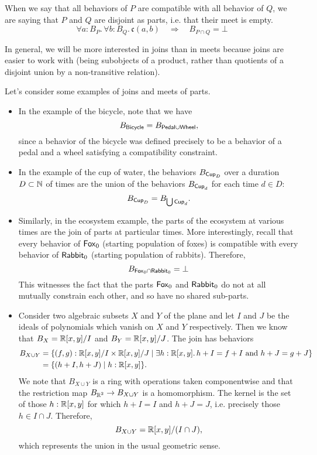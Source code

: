 When we say that all behaviors of $P$ are compatible with all behavior of $Q$, we are saying that $P$ and $Q$ are disjoint as parts, i.e. that their meet is empty.
$$\forall a : B_P.\, \forall b : B_Q.\, \mathfrak{c}(a, b) \quad\Rightarrow\quad B_{P \cap Q} = \bot$$

In general, we will be more interested in joins than in meets because joins are easier to work with (being subobjects of a product, rather than quotients of a disjoint union by a non-transitive relation).

\begin{ex}
Let's consider some examples of joins and meets of parts.
\begin{itemize}
    \item In the example of the bicycle, note that we have
    $$B_{\mathsf{{Bicycle}}} = B_{\mathsf{{Pedal}} \cup \mathsf{{Wheel}}},$$
    since a behavior of the bicycle was defined precisely to be a behavior of a pedal and a wheel satisfying a compatibility constraint.
    
    \item In the example of the cup of water, the behaviors $B_{\mathsf{{Cup}}_D}$ over a duration $D \subset \operatorname{\mathbb{N}}$ of times are the union of the behaviors $B_{\mathsf{{Cup}}_d}$ for each time $d \in D$:
    $$B_{\mathsf{{Cup}}_D} = B_{\bigcup \mathsf{{Cup}}_d}.$$
    
    \item Similarly, in the ecosystem example, the parts of the ecosystem at various times are the join of parts at particular times. More interestingly, recall that every behavior of $\mathsf{{Fox}}_0$ (starting population of foxes) is compatible with every behavior of $\mathsf{{Rabbit}}_0$ (starting population of rabbits). Therefore, 
    $$B_{\mathsf{{Fox}}_0 \cap \mathsf{{Rabbit}}_0} = \bot$$
    This witnesses the fact that the parts $\mathsf{{Fox}}_0$ and $\mathsf{{Rabbit}}_0$ do not at all mutually constrain each other, and so have no shared sub-parts.
    
    \item Consider two algebraic subsets $X$ and $Y$ of the plane and let $I$ and $J$ be the ideals of polynomials which vanish on $X$ and $Y$ respectively. Then we know that $B_X = \operatorname{\mathbb{R}}[x, y]/I$ and $B_Y = \operatorname{\mathbb{R}}[x, y]/J$. The join has behaviors 
    \begin{align*}
        B_{X \cup Y} &= \{(f, g) : \operatorname{\mathbb{R}}[x, y]/I \times \operatorname{\mathbb{R}}[x, y]/J \mid \exists h : \operatorname{\mathbb{R}}[x, y].\, h + I = f + I \mbox{ and } h + J = g + J\} \\
            &= \{(h + I, h + J) \mid h : \operatorname{\mathbb{R}}[x, y]\}.
    \end{align*}
    We note that $B_{X \cup Y}$ is a ring with operations taken componentwise and that the restriction map $B_{\operatorname{\mathbb{R}}^2} \to B_{X \cup Y}$ is a homomorphism. The kernel is the set of those $h : \operatorname{\mathbb{R}}[x, y]$ for which $h + I = I$ and $h + J = J$, i.e. precisely those $h \in I \cap J$. Therefore, 
    $$B_{X \cup Y} = \operatorname{\mathbb{R}}[x, y]/(I \cap J),$$
    which represents the union in the usual geometric sense.  
    
\end{itemize}
\end{ex}

